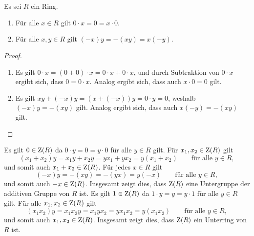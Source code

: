 \section{}





\subsection{}

\begin{lemma}
  Es sei $R$ ein Ring.
  \begin{enumerate}
    \item
      Für alle $x \in R$ gilt $0 \cdot x = 0 = x \cdot 0$.
    \item
      Für alle $x, y \in R$ gilt $(-x)y = -(xy) = x(-y)$.
  \end{enumerate}
\end{lemma}

\begin{proof}
  \begin{enumerate}
    \item
      Es gilt $0 \cdot x= (0 + 0) \cdot x  = 0 \cdot x + 0 \cdot x$, und durch Subtraktion von $0 \cdot x$ ergibt sich, dass $0 = 0 \cdot x$.
      Analog ergibt sich, dass auch $x \cdot 0 = 0$ gilt.
    \item
      Es gilt $xy + (-x)y = (x + (-x))y = 0 \cdot y = 0$, weshalb $(-x)y = -(xy)$ gilt.
      Analog ergibt sich, dass auch $x(-y) = -(xy)$ gilt.
    \qedhere
  \end{enumerate}
\end{proof}

Es gilt $0 \in \operatorname{Z}(R)$ da $0 \cdot y = 0 = y \cdot 0$ für alle $y \in R$ gilt.
Für $x_1, x_2 \in \operatorname{Z}(R)$ gilt
\[
    (x_1 + x_2) y
  = x_1 y + x_2 y
  = y x_1 + y x_2
  = y (x_1 + x_2) 
  \qquad
  \text{für alle $y \in R$},
\]
und somit auch $x_1 + x_2 \in \operatorname{Z}(R)$.
Für jedes $x \in R$ gilt
\[
    (-x) y
  = -(xy)
  = -(yx)
  = y (-x)
  \qquad
  \text{für alle $y \in R$},
\]
und somit auch $-x \in \operatorname{Z}(R)$.
Insgesamt zeigt dies, dass $\operatorname{Z}(R)$ eine Untergruppe der additiven Gruppe von $R$ ist.
Es gilt $1 \in \operatorname{Z}(R)$ da $1 \cdot y = y = y \cdot 1$ für alle $y \in R$ gilt.
Für alle $x_1, x_2 \in \operatorname{Z}(R)$ gilt
\[
    (x_1 x_2) y
  = x_1 x_2 y
  = x_1 y x_2
  = y x_1 x_2
  = y (x_1 x_2)
  \qquad
  \text{für alle $y \in R$},
\]
und somit auch $x_1, x_2 \in \operatorname{Z}(R)$.
Insgesamt zeigt dies, dass $\operatorname{Z}(R)$ ein Unterring von $R$ ist.

